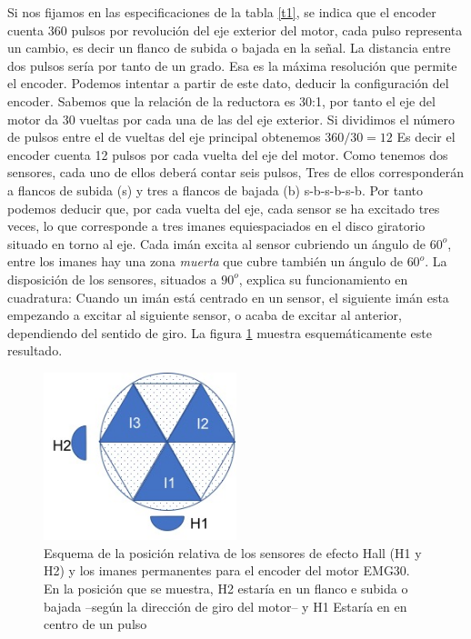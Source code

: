 \documentclass[10pt,a4paper]{report}
\begin{document}
Si nos fijamos en las especificaciones de la tabla \ref{t1}, se indica que el encoder cuenta 360 pulsos por revolución del eje exterior del motor, cada pulso representa un cambio, es decir un flanco de subida o bajada en la señal. La distancia entre dos pulsos sería por tanto de un grado. Esa es la máxima resolución que permite el encoder. Podemos intentar a partir de este dato, deducir la configuración del encoder. Sabemos que la relación de la reductora es 30:1, por tanto el eje del motor da 30 vueltas por cada una de las del eje exterior. Si dividimos el número de pulsos entre el de vueltas del eje principal obtenemos $360/30 = 12$ Es decir el encoder cuenta 12 pulsos por cada vuelta del eje del motor. Como tenemos dos sensores, cada uno de ellos deberá contar seis pulsos,  Tres de ellos corresponderán a flancos de subida (s) y tres a flancos de bajada (b) s-b-s-b-s-b. Por tanto podemos deducir que, por cada vuelta del eje, cada sensor se ha excitado tres veces, lo que corresponde a tres imanes equiespaciados en el disco giratorio situado en torno al eje. Cada imán excita al sensor cubriendo un ángulo de $60^o$, entre los imanes hay una zona \emph{muerta} que cubre también un ángulo de $60^o$. La disposición de los sensores, situados a $90^o$, explica su funcionamiento en cuadratura: Cuando un imán está centrado en un sensor, el siguiente imán esta empezando a excitar al siguiente sensor, o acaba de excitar al anterior, dependiendo del sentido de giro. La figura \ref{f7} muestra esquemáticamente este resultado.

\begin{figure}
\centering
\includegraphics[width= 0.5\textwidth]{esqhall.jpg}
\caption{Esquema de la posición relativa de los sensores de efecto Hall (H1 y H2) y los imanes permanentes para el encoder del motor EMG30. En la posición que se muestra, H2 estaría en un flanco e subida o bajada --según la dirección de giro del motor-- y H1 Estaría en en centro de un pulso}\label{f7}
\end{figure} 
\end{document}
